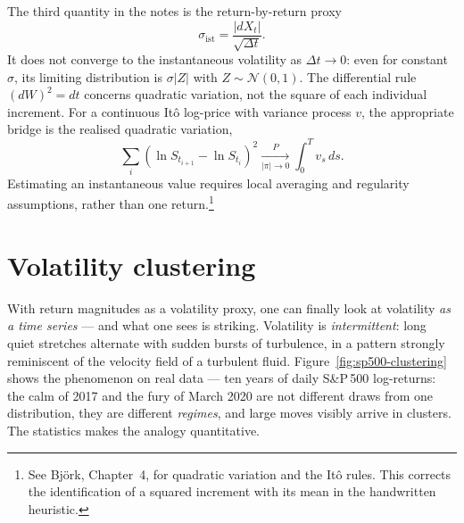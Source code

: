 The third quantity in the notes is the return-by-return proxy
\[
 \sigma_{\text{ist}}=\frac{|dX_t|}{\sqrt{\Delta t}}.
\]
It does not converge to the instantaneous volatility as $\Delta t\to0$: even for constant $\sigma$, its limiting distribution is $\sigma|Z|$ with $Z\sim\mathcal N(0,1)$.
The differential rule $(dW)^2=dt$ concerns quadratic variation, not the square of each individual increment.
For a continuous It\^o log-price with variance process $v$, the appropriate bridge is the realised quadratic variation,
\[
 \sum_i\left(\ln S_{t_{i+1}}-\ln S_{t_i}\right)^2
 \xrightarrow[|\pi|\to0]{P}\int_0^T v_s\,ds.
\]
Estimating an instantaneous value requires local averaging and regularity assumptions, rather than one return.\footnote{See Bj\"ork\cite{Bjork2020}, Chapter~4, for quadratic variation and the It\^o rules.
This corrects the identification of a squared increment with its mean in the handwritten heuristic.}

\section{Volatility clustering}\label{sec:vol-clustering}

With return magnitudes as a volatility proxy, one can finally look at volatility \emph{as a time series} --- and what one sees is striking.
Volatility is \emph{intermittent}: long quiet stretches alternate with sudden bursts of turbulence, in a pattern strongly reminiscent of the velocity field of a turbulent fluid.
Figure~\ref{fig:sp500-clustering} shows the phenomenon on real data --- ten years of daily S\&P\,500 log-returns: the calm of 2017 and the fury of March 2020 are not different draws from one distribution, they are different \emph{regimes}, and large moves visibly arrive in clusters.
The statistics makes the analogy quantitative.

